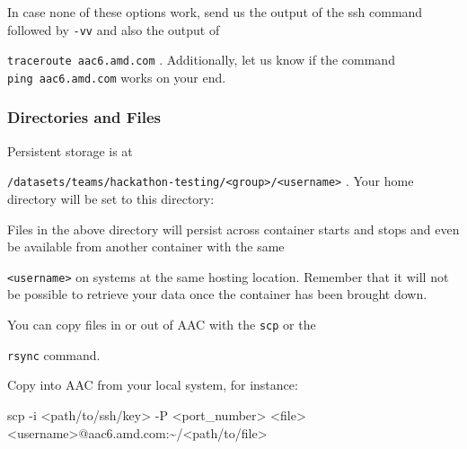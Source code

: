 \documentclass[
]{article}
\let\oldtexttt\texttt
\renewcommand{\texttt}[1]{
  \colorbox{Light}{\oldtexttt{#1}}
}
\newenvironment{Shaded}{}{}
\newcommand{\ExtensionTok}[1]{#1}
\newcommand{\FunctionTok}[1]{\textcolor[rgb]{0.02,0.16,0.49}{#1}}
\newcommand{\NormalTok}[1]{#1}
\newcommand{\OperatorTok}[1]{\textcolor[rgb]{0.40,0.40,0.40}{#1}}
\newcommand{\VariableTok}[1]{\textcolor[rgb]{0.10,0.09,0.49}{#1}}
\begin{document}
In case none of these options work, send us the output of the ssh
command followed by \texttt{-vv} and also the output of
\texttt{traceroute\ aac6.amd.com}. Additionally, let us know if the
command \texttt{ping\ aac6.amd.com} works on your end.

\hypertarget{directories-and-files}{%
\subsubsection{Directories and Files}\label{directories-and-files}}

Persistent storage is at
\texttt{/datasets/teams/hackathon-testing/\textless{}group\textgreater{}/\textless{}username\textgreater{}}.
Your home directory will be set to this directory:

\begin{Shaded}
\end{Shaded}

Files in the above directory will persist across container starts and
stops and even be available from another container with the same
\texttt{\textless{}username\textgreater{}} on systems at the same
hosting location. Remember that it will not be possible to retrieve your
data once the container has been brought down.

You can copy files in or out of AAC with the \texttt{scp} or the
\texttt{rsync} command.

Copy into AAC from your local system, for instance:

\begin{Shaded}
\begin{Highlighting}[]
\FunctionTok{scp}\NormalTok{ {-}i }\OperatorTok{\textless{}}\NormalTok{path/to/ssh/key}\OperatorTok{\textgreater{}}\NormalTok{ {-}P }\OperatorTok{\textless{}}\NormalTok{port\_number}\OperatorTok{\textgreater{}} \OperatorTok{\textless{}}\NormalTok{file}\OperatorTok{\textgreater{}} \OperatorTok{\textless{}}\NormalTok{username}\OperatorTok{\textgreater{}}\NormalTok{@aac6.amd.com:\textasciitilde{}/}\OperatorTok{\textless{}}\NormalTok{path/to/file}\OperatorTok{\textgreater{}}
\end{Highlighting}
\end{Shaded}
\end{document}
